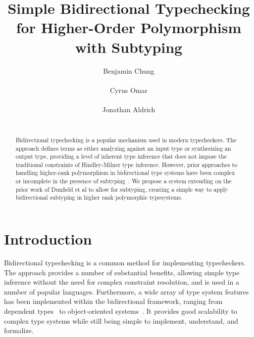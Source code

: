 \documentclass{sig-alternate}
\begin{document}
\title{Simple Bidirectional Typechecking for Higher-Order Polymorphism with Subtyping}
\author{
	\alignauthor
	Benjamin Chung\\
	\\
	\alignauthor
	Cyrus Omar\\
	\\
	\alignauthor
	Jonathan Aldrich\\
	\\
}

\maketitle

\begin{abstract}
Bidirectional typechecking is a popular mechanism used in modern typecheckers. The approach defines terms as either analyzing against an input type or synthesizing an output type, providing a level of inherent type inference that does not impose the traditional constraints of Hindley-Milner type inference. However, prior approaches to handling higher-rank polymorphism in bidirectional type systems have been complex~\cite{Pierce:2000:LTI:345099.345100} or incomplete in the presence of subtyping~\cite{Dunfield:2013:CEB:2544174.2500582}. We propose a system extending on the prior work of Dunfield et al to allow for subtyping, creating a simple way to apply bidirectional subtyping in higher rank polymorphic typesystems.
\end{abstract}

\section{Introduction}
Bidirectional typechecking is a common method for implementing typecheckers. The approach provides a number of substantial benefits, allowing simple type inference without the need for complex constraint resolution, and is used in a number of popular languages. Furthermore, a wide array of type system features has been implemented within the bidirectional framework, ranging from dependent types~\cite{Coquand96analgorithm} to object-oriented systems~\cite{odersky2001colored}. It provides good scalability to complex type systems while still being simple to implement, understand, and formalize.
\end{document}

